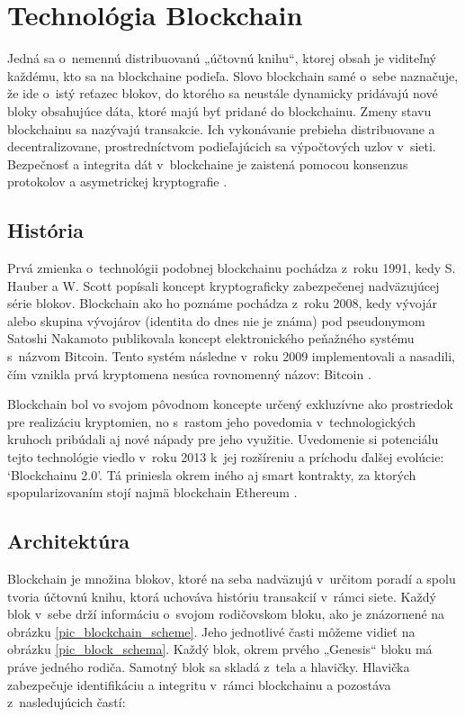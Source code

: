 \chapter{Technológia Blockchain}
Jedná sa o~nemennú distribuovanú „účtovnú knihu“, ktorej obsah je viditeľný každému, kto sa na blockchaine podieľa. Slovo blockchain samé o~sebe naznačuje, že ide o~istý reťazec blokov, do ktorého sa neustále dynamicky pridávajú nové bloky obsahujúce dáta, ktoré majú byť pridané do blockchainu. Zmeny stavu blockchainu sa nazývajú transakcie. Ich vykonávanie prebieha distribuovane a decentralizovane, prostredníctvom podieľajúcich sa výpočtových uzlov v~sieti. Bezpečnosť a integrita dát v~blockchaine je zaistená pomocou konsenzus protokolov a asymetrickej kryptografie \cite{blockchain_architecture2}.

\section{História}
Prvá zmienka o~technológii podobnej blockchainu pochádza z~roku 1991, kedy S. Hauber a W. Scott popísali koncept kryptograficky zabezpečenej nadväzujúcej série blokov. Blockchain ako ho poznáme pochádza z~roku 2008, kedy vývojár alebo skupina vývojárov (identita do dnes nie je známa) pod pseudonymom Satoshi Nakamoto publikovala koncept elektronického peňažného systému s~názvom Bitcoin. Tento systém následne v~roku 2009 implementovali a nasadili, čím vznikla prvá kryptomena nesúca rovnomenný názov: Bitcoin \cite{blockchain_history1}.

Blockchain bol vo svojom pôvodnom koncepte určený exkluzívne ako prostriedok pre realizáciu kryptomien, no s~rastom jeho povedomia v~technologických kruhoch pribúdali aj nové nápady pre jeho využitie. Uvedomenie si potenciálu tejto technológie viedlo v~roku 2013 k~jej rozšíreniu a príchodu ďalšej evolúcie: ‘Blockchainu 2.0’. Tá priniesla okrem iného aj smart kontrakty, za ktorých spopularizovaním stojí najmä blockchain Ethereum \cite{blockchain_history2}.

\section{Architektúra}
Blockchain je množina blokov, ktoré na seba nadväzujú v~určitom poradí a spolu tvoria účtovnú knihu, ktorá uchováva históriu transakcií v~rámci siete. Každý blok v~sebe drží informáciu o~svojom rodičovskom bloku, ako je znázornené na obrázku \ref{pic_blockchain_scheme}. Jeho jednotlivé časti môžeme vidieť na obrázku \ref{pic_block_schema}. Každý blok, okrem prvého „Genesis“ bloku má práve jedného rodiča. Samotný blok sa skladá z~tela a hlavičky. Hlavička zabezpečuje identifikáciu a integritu v~rámci blockchainu a pozostáva z~nasledujúcich častí:

